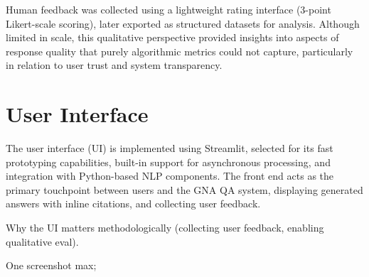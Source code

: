\begin{spacing}{1.5}
Human feedback was collected using a lightweight rating interface (3-point Likert-scale scoring), later exported as structured datasets for analysis. Although limited in scale, this qualitative perspective provided insights into aspects of response quality that purely algorithmic metrics could not capture, particularly in relation to user trust and system transparency.



\section{User Interface}
The user interface (UI) is implemented using Streamlit, selected for its fast prototyping capabilities, built-in support for asynchronous processing, and integration with Python-based NLP components. The front end acts as the primary touchpoint between users and the GNA QA system, displaying generated answers with inline citations, and collecting user feedback.

Why the UI matters methodologically (collecting user feedback, enabling qualitative eval).

One screenshot max;


\end{spacing}
